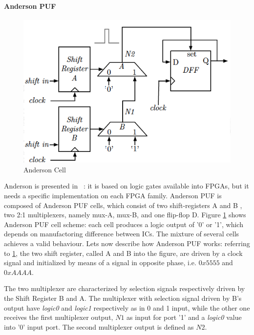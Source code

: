 \documentclass[../tesi.tex]{subfiles}
\begin{document}
\paragraph{Anderson PUF} \label{par:andersonpuf}
\begin{figure}
\centering
\includegraphics[scale=0.40]{images/andersonpuf.png}
\caption{Anderson Cell}
\label{fig:andersoncell}
\end{figure}
Anderson \puf{} is presented in ~\cite{anderson2010puf}: it is based on logic gates available into FPGAs, but it needs a specific implementation on each FPGA family. Anderson PUF is composed of Anderson PUF cells, which consist of two shift-registers A and B , two 2:1 multiplexers, namely mux-A, mux-B, and one flip-flop D. 
Figure \ref{fig:andersoncell} shows Anderson PUF cell scheme: each cell produces a logic output of '0' or '1', which depends on manufactoring difference between ICs. The mixture of several cells achieves a valid \puf{}  behaviour. Lets now describe how Anderson PUF works: referring to  \ref{fig:andersoncell}, the two shift register, called A and B into the figure, are driven by a clock signal and initialized by means of a signal in opposite phase, i.e. $0x5555$ and $0xAAAA$. 

The two multiplexer are characterized by selection signals respectively driven by the Shift Register B and A. The multiplexer with selection signal driven by B's output have  \emph{logic0} and \emph{logic1} respectively as in 0 and 1 input, while the other one receives the first multiplexer output, $N1$ as input for port '1' and a \emph{logic0} value into '0' input port. The second multiplexer output is defined as $N2$. 
\end{document}
